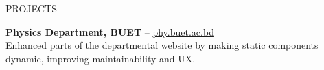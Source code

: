 \documentclass{resume} %
\begin{document}
\begin{rSection}{PROJECTS}
\item \textbf{Physics Department, BUET} – \href{https://phy.buet.ac.bd/}{phy.buet.ac.bd} \\
Enhanced parts of the departmental website by making static components dynamic, improving maintainability and UX.
\end{rSection}


\end{document}
